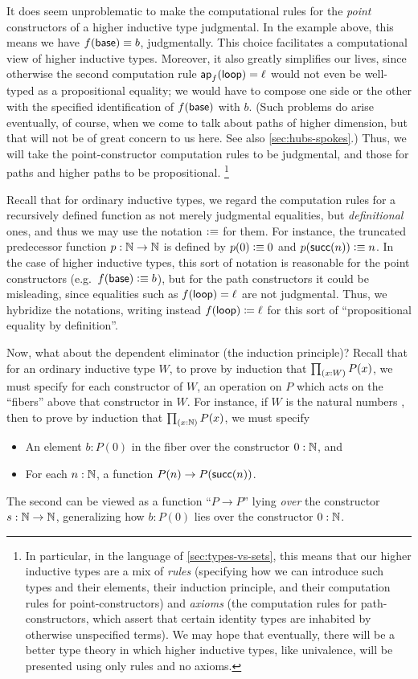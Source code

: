 It does seem unproblematic to make the computational rules for the \emph{point} constructors of a higher inductive type judgmental.
In the example above, this means we have $f(\mathsf{base})\equiv b$, judgmentally.
This choice facilitates a computational view of higher inductive types.
Moreover, it also greatly simplifies our lives, since otherwise the second computation rule $\mathsf{ap}_{f} (\mathsf{loop}) = \ell$ would not even be well-typed as a propositional equality; we would have to compose one side or the other with the specified identification of $f(\mathsf{base})$ with $b$.
(Such problems do arise eventually, of course, when we come to talk about paths of higher dimension, but that will not be of great concern to us here.
See also \autoref{sec:hubs-spokes}.)
Thus, we will take the point-constructor computation rules to be judgmental, and those for paths and higher paths to be propositional.%
\footnote{In particular, in the language of \autoref{sec:types-vs-sets}, this means that our higher inductive types are a mix of \emph{rules} (specifying how we can introduce such types and their elements, their induction principle, and their computation rules for point-constructors) and \emph{axioms} (the computation rules for path-constructors, which assert that certain identity types are inhabited by otherwise unspecified terms).
We may hope that eventually, there will be a better type theory in which higher inductive types, like univalence, will be presented using only rules and no axioms.}

\begin{rmk}\label{rmk:defid}
Recall that for ordinary inductive types, we regard the computation rules for a recursively defined function as not merely judgmental equalities, but \emph{definitional} ones, and thus we may use the notation $\vcentcolon\equiv$ for them.
For instance, the truncated predecessor function $p:\mathbb{N}\to\mathbb{N}$ is defined by $p(0)\vcentcolon\equiv 0$ and $p(\mathsf{succ}(n))\vcentcolon\equiv n$.
In the case of higher inductive types, this sort of notation is reasonable for the point constructors (e.g.\ $f(\mathsf{base})\vcentcolon\equiv b$), but for the path constructors it could be misleading, since equalities such as ${f}\mathopen{}\left({\mathsf{loop}}\right)\mathclose{} = \ell$ are not judgmental.
Thus, we hybridize the notations, writing instead ${f}\mathopen{}\left({\mathsf{loop}}\right)\mathclose{} \coloneqq \ell$ for this sort of ``propositional equality by definition''.
\end{rmk}

Now, what about the dependent eliminator (the induction principle)?
Recall that for an ordinary inductive type $W$, to prove by induction that $\prd{x:W} P(x)$, we must specify for each constructor of $W$, an operation on $P$ which acts on the ``fibers'' above that constructor in $W$.
For instance, if $W$ is the natural numbers \nat, then to prove by induction that $\prd{x:\nat} P(x)$, we must specify
\begin{itemize}
\item An element $b:P(0)$ in the fiber over the constructor $0:\mathbb{N}$, and
\item For each $n:\mathbb{N}$, a function $P(n) \to P(\mathsf{succ}(n))$.
\end{itemize}
The second can be viewed as a function ``$P\to P$'' lying \emph{over} the constructor $s:\mathbb{N}\to\mathbb{N}$, generalizing how $b:P(0)$ lies over the constructor $0:\mathbb{N}$.

